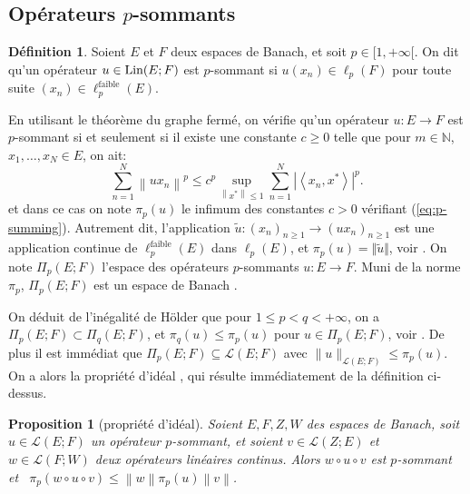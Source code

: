 \documentclass{smfart}
\theoremstyle{plain}
\newtheorem{proposition}[theorem]{Proposition}
\theoremstyle{definition}
\newtheorem{definition}[theorem]{Définition}
\newcommand {\FAIBLE} {\text{faible}}
\newcommand {\norm}[1] {\| #1 \|}               %
\newcommand {\BOUNDED} {{\mathcal L}}
\newcommand {\LIN} {\text{\rm Lin}}
\begin{document}
\subsection{Opérateurs $p$-sommants}

\begin{definition}\label{def:p-summing}
  Soient $E$ et $F$ deux espaces de Banach, et soit $p \in
  [1,+\infty[$. On dit qu'un opérateur $u \in \LIN(E; F)$ est
  $p$-sommant si $u(x_n) \in \ell_p(F)$ pour toute suite $(x_n) \in
  \ell_p^\FAIBLE(E)$.
\end{definition}

\noindent En utilisant le théorème du graphe fermé, on vérifie qu'un opérateur
$u:E\to F$ est $p$-sommant si et seulement si il existe une constante
$c\geq 0$ telle que pour $m\in\mathbb{N}$, $x_1,\dots,x_N \in E$, on
ait:
\begin{equation}\label{eq:p-summing}
  \sum_{n=1}^{N}\left\|ux_n\right\|^{p}\leq c^{p}\sup_{\left\|x^*\right\|\leq1}\sum_{n=1}^{N}\left|\left\langle
      x_n,x^*\right\rangle\right|^{p}.
\end{equation} 
et dans ce cas on note $\pi_p(u)$ le infimum des constantes $c>0$
vérifiant (\ref{eq:p-summing}). Autrement dit, l'application $\tilde
u: (x_n)_{n\ge 1} \to (ux_n)_{n\ge 1}$ est une application continue de
$\ell_p^\FAIBLE(E)$ dans $\ell_p(E)$, et $\pi_p(u)= \Vert \tilde u
\Vert$, voir \cite[Proposition 2.1.]{DJT}.  On note
$\Pi_p\left(E;F\right)$ l'espace des opérateurs $p$-sommants $u:E \to
F$. Muni de la norme $\pi_p$, $\Pi_p\left(E;F\right)$ est un espace de
Banach \cite[Proposition 2.6, p. 38]{DJT}.  

On déduit de l'inégalité
de Hölder que pour $1 \le p < q < +\infty$, on a  $\Pi_p(E; F)\subset
\Pi_q(E; F)$, et $\pi_q(u)\le \pi_p(u)$ pour $u \in \Pi_p(E; F)$, voir \cite[Théorème
2.8]{DJT}.  De
plus il est immédiat que $\Pi_p(E; F) \subseteq \BOUNDED(E; F)$ avec
$\norm{u}_{\BOUNDED(E; F)} \le \pi_p(u)$.  On a alors la propriété
d'idéal \cite[p. 37]{DJT}, qui résulte immédiatement de la définition
ci-dessus.

\begin{proposition}[propriété d'idéal]
  Soient $E, F, Z, W$ des espaces de Banach, soit $u \in \BOUNDED(E; F)$
  un opérateur $p$-sommant, et soient $v \in \BOUNDED(Z; E)$ et $w \in
  \BOUNDED(F ; W)$ deux opérateurs linéaires continus. Alors
  $w{\circ}u{\circ}v$ est $p$-sommant et \ $\pi_p\left(w{\circ}
    u{\circ}v\right) \leq
  \left\|w\right\|\pi_p\left(u\right)\left\|v\right\|$.
\end{proposition}
\end{document}
